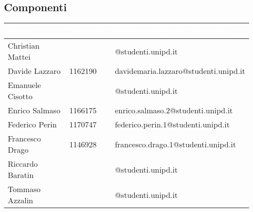 \subsection{Componenti}
{
	\renewcommand{\arraystretch}{2}
	\begin{longtable}{ C{4cm} C{2cm} C{8cm} }
		\textcolor{white}{\textbf{Nome}} & \textcolor{white}{\textbf{Matricola}} & \textcolor{white}{\textbf{Indirizzo di posta elettronica}}\\\endhead	
		
		Christian Mattei & & @studenti.unipd.it \\
		Davide Lazzaro & 1162190 & davidemaria.lazzaro@studenti.unipd.it\\
		Emanuele Cisotto & & @studenti.unipd.it\\
		Enrico Salmaso & 1166175 & enrico.salmaso.2@studenti.unipd.it \\
		Federico Perin & 1170747 & federico.perin.1@studenti.unipd.it \\
		Francesco Drago & 1146928 & francesco.drago.1@studenti.unipd.it \\
		Riccardo Baratin & & @studenti.unipd.it \\
		Tommaso Azzalin & & @studenti.unipd.it \\
		
		
	\end{longtable}
}